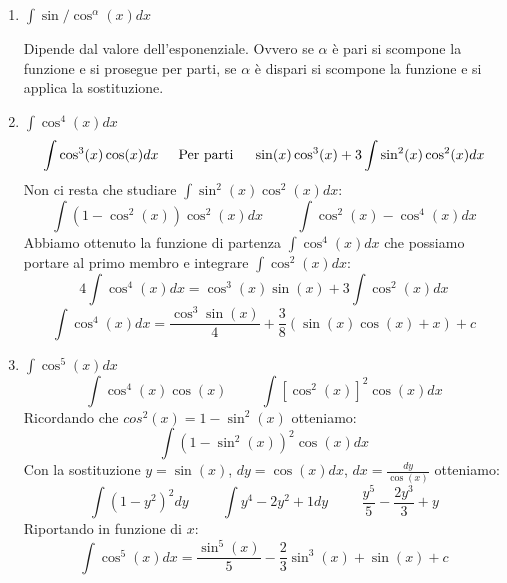 \begin{exercise}\phantom{}
\begin{enumerate}
    \item $\int\sin/\cos ^\alpha(x)dx$
    
    Dipende dal valore dell'esponenziale. Ovvero se $\alpha$ è pari si scompone la funzione e si prosegue per parti, se $\alpha$ è dispari si scompone la funzione e si applica la sostituzione.
    
    \item $\int\cos^4(x)dx$
    \begin{equation*}\int\cos^3(x)\cos(x)dx\hspace{.5cm}\text{Per parti}\hspace{.5cm}\sin(x)\cos^3(x)+3\int\sin^2(x)\cos^2(x)dx\end{equation*}
    Non ci resta che studiare $\int\sin^2(x)\cos^2(x)dx$:
    \begin{equation*}\int(1-\cos^2(x))\cos^2(x)dx\hspace{1cm}\int\cos^2(x)-\cos^4(x)dx\end{equation*}
    Abbiamo ottenuto la funzione di partenza $\int\cos^4(x)dx$ che possiamo portare al primo membro e integrare $\int\cos^2(x)dx$:
    \begin{equation*}4\int\cos^4(x)dx=\cos^3(x)\sin(x)+3\int\cos^2(x)dx\end{equation*}
    \begin{equation*}
        \int\cos^4(x)dx=\frac{\cos^3\sin(x)}{4}+\frac{3}{8}(\sin(x)\cos(x)+x)+c
    \end{equation*}
    
    \item $\int\cos^5(x)dx$
    \begin{equation*}\int\cos^4(x)\cos(x)\hspace{1cm}\int[\cos^2(x)]^2\cos(x)dx\end{equation*}
    Ricordando che $cos^2(x)=1-\sin^2(x)$ otteniamo:
    \begin{equation*}\int(1-\sin^2(x))^2\cos(x)dx\end{equation*}
    Con la sostituzione $y=\sin(x)$, $dy=\cos(x)dx$, $dx=\frac{dy}{\cos(x)}$ otteniamo:
    \begin{equation*}\int(1-y^2)^2dy\hspace{1cm}\int y^4-2y^2+1dy\hspace{1cm}\frac{y^5}{5}-\frac{2y^3}{3}+y\end{equation*}
    Riportando in funzione di $x$:
    \begin{equation*}
        \int\cos^5(x)dx = \frac{\sin^5(x)}{5}-\frac{2}{3}\sin^3(x)+\sin(x)+c
    \end{equation*}
\end{enumerate}
\end{exercise}